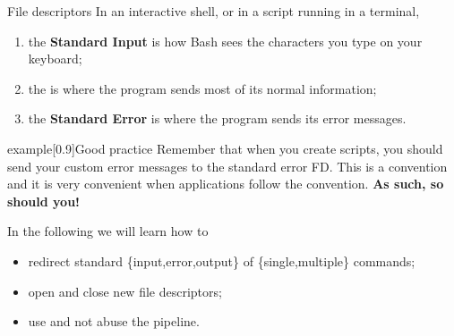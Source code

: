\begin{frame}
\begin{center}
    \end{center}
\end{frame}
\begin{frame}{File descriptors}
    \vspace{-2mm}
    In an interactive shell, or in a script running in a terminal,
    \begin{enumerate}\addtocounter{enumi}{-1}
        \item the \textbf{Standard Input} is how Bash sees the characters you type on your keyboard;
        \item the  is where the program sends most of its normal information;
        \item the \alert{\textbf{Standard Error}} is where the program sends its error messages.
    \end{enumerate}
    \begin{varblock}{example}[0.9\textwidth]{Good practice}
        Remember that when you create scripts, you should send your custom error messages to the standard error FD.
        This is a convention and it is very convenient when applications follow the convention. \textbf{As such, so should you!}
    \end{varblock}
    \medskip
    In the following we will learn how to
    \begin{itemize}
        \item redirect standard \{input,error,output\} of \{single,multiple\} commands;
        \item open and close new file descriptors;
        \item use and not abuse the pipeline.
    \end{itemize}
\end{frame}
